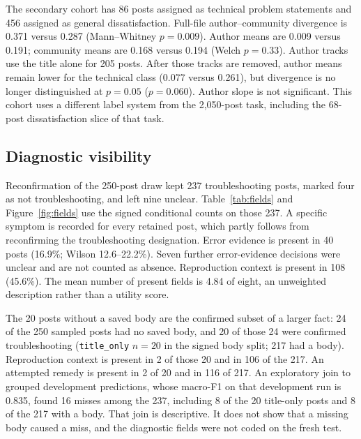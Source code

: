 \documentclass[conference,letterpaper]{IEEEtran}
\begin{document}
The secondary cohort has 86 posts assigned as technical problem statements and 456 assigned as general dissatisfaction. Full-file author--community divergence is 0.371 versus 0.287 (Mann--Whitney $p=0.009$). Author means are 0.009 versus 0.191; community means are 0.168 versus 0.194 (Welch $p=0.33$). Author tracks use the title alone for 205 posts. After those tracks are removed, author means remain lower for the technical class (0.077 versus 0.261), but divergence is no longer distinguished at $p=0.05$ ($p=0.060$). Author slope is not significant. This cohort uses a different label system from the 2,050-post task, including the 68-post dissatisfaction slice of that task.

\subsection{Diagnostic visibility}
Reconfirmation of the 250-post draw kept 237 troubleshooting posts, marked four as not troubleshooting, and left nine unclear. Table~\ref{tab:fields} and Figure~\ref{fig:fields} use the signed conditional counts on those 237. A specific symptom is recorded for every retained post, which partly follows from reconfirming the troubleshooting designation. Error evidence is present in 40 posts (16.9\%; Wilson 12.6--22.2\%). Seven further error-evidence decisions were unclear and are not counted as absence. Reproduction context is present in 108 (45.6\%). The mean number of present fields is 4.84 of eight, an unweighted description rather than a utility score.

The 20 posts without a saved body are the confirmed subset of a larger fact: 24 of the 250 sampled posts had no saved body, and 20 of those 24 were confirmed troubleshooting (\texttt{title\_only} $n=20$ in the signed body split; 217 had a body). Reproduction context is present in 2 of those 20 and in 106 of the 217. An attempted remedy is present in 2 of 20 and in 116 of 217. An exploratory join to grouped development predictions, whose macro-F1 on that development run is 0.835, found 16 misses among the 237, including 8 of the 20 title-only posts and 8 of the 217 with a body. That join is descriptive. It does not show that a missing body caused a miss, and the diagnostic fields were not coded on the fresh test.
\end{document}
